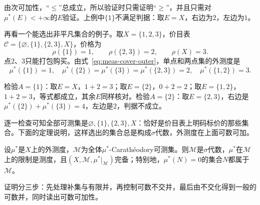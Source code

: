 由次可加性，“$\leq$”总成立，所以验证时只需证明“$\geq$”，并且只需对$\mu^*(E)<+\infty$的$E$验证。上例中$\{1\}$不满足判据：取$E=X$，右边为$2$，左边为$1$。

再看一个能选出非平凡集合的例子。取$X=\{1,2,3\}$，价目表$\mathcal C=\{\varnothing,\{1\},\{2,3\},X\}$，价格为
\[
 \rho(\{1\})=1,\qquad\rho(\{2,3\})=2,\qquad\rho(X)=3.
\]
点$2$、$3$只能打包购买。由式~\eqref{eq:meas-cover-outer}，单点和两点集的外测度是
\[
 \mu^*(\{1\})=1,\quad \mu^*(\{2\})=\mu^*(\{3\})=\mu^*(\{2,3\})=2,\quad \mu^*(\{1,2\})=3.
\]

检验$A=\{1\}$：取$E=X$，$1+2=3$；取$E=\{2\}$，$0+2=2$；取$E=\{1,2\}$，$1+2=3$，等式都成立，其余$E$同样核对。检验$A=\{2\}$：取$E=\{2,3\}$，右边是$\mu^*(\{2\})+\mu^*(\{3\})=4$，左边是$2$，判据不成立。

逐一检查可知全部可测集是$\varnothing,\{1\},\{2,3\},X$：恰好是价目表上明码标价的那些集合。下面的定理说明，这样选出的集合总是构成$\sigma$代数，外测度在上面可数可加。

\begin{theorem}[Carathéodory定理]
\label{thm:meas-caratheodory}
设$\mu^*$是$X$上的外测度，$\mathcal M$为全体$\mu^*$-Carathéodory可测集。则$\mathcal M$是$\sigma$代数，$\mu^*$在$\mathcal M$上的限制是测度，且$(X,\mathcal M,\mu^*|_{\mathcal M})$完备；特别地，$\mu^*(N)=0$的集合$N$都属于$\mathcal M$。
\end{theorem}

证明分三步：先处理补集与有限并，再控制可数不交并，最后由不交化得到一般的可数并，同时读出可数可加性。

